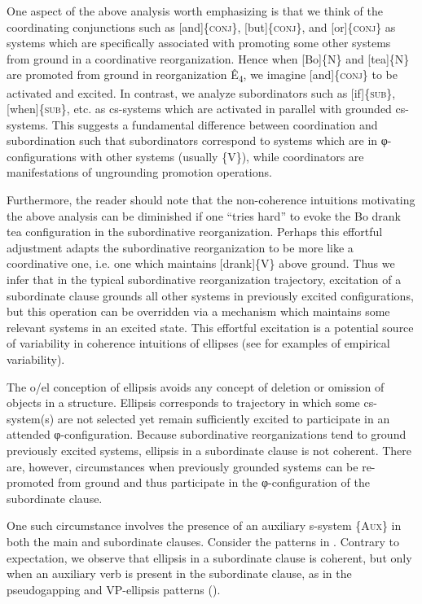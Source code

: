   One aspect of the above analysis worth emphasizing is that we think of the coordinating conjunctions such as [and]\{\textsc{conj}\}, [but]\{\textsc{conj}\}, and [or]\{\textsc{conj}\} as systems which are specifically associated with promoting some other systems from ground in a coordinative reorganization. Hence when [Bo]\{N\} and [tea]\{N\} are promoted from ground in reorganization Ê\textsubscript{4}, we imagine [and]\{\textsc{conj}\} to be activated and excited. In contrast, we analyze subordinators such as [if]\{\textsc{sub}\}, [when]\{\textsc{sub}\}, etc. as cs-systems which are activated in parallel with grounded cs-systems. This suggests a fundamental difference between coordination and subordination such that subordinators correspond to systems which are in φ-configurations with other systems (usually \{V\}), while coordinators are manifestations of ungrounding promotion operations.

  Furthermore, the reader should note that the non-coherence intuitions motivating the above analysis can be diminished if one “tries hard” to evoke the {\textbar}Bo drank tea{\textbar} configuration in the subordinative reorganization. Perhaps this effortful adjustment adapts the subordinative reorganization to be more like a coordinative one, i.e. one which maintains [drank]\{V\} above ground. Thus we infer that in the typical subordinative reorganization trajectory, excitation of a subordinate clause grounds all other systems in previously excited configurations, but this operation can be overridden via a mechanism which maintains some relevant systems in an excited state. This effortful excitation is a potential source of variability in coherence intuitions of ellipses (see \citealt{FrazierClifton2005,Phillips2003,PhillipsParker2014} for examples of empirical variability). 

  The o/el conception of ellipsis avoids any concept of deletion or omission of objects in a structure. Ellipsis corresponds to trajectory in which some cs-system(s) are not selected yet remain sufficiently excited to participate in an attended φ-configuration. Because subordinative reorganizations tend to ground previously excited systems, ellipsis in a subordinate clause is not coherent. There are, however, circumstances when previously grounded systems can be re-promoted from ground and thus participate in the φ-configuration of the subordinate clause. 

  One such circumstance involves the presence of an auxiliary s-system \{A\textsc{ux}\} in both the main and subordinate clauses. Consider the patterns in {}. Contrary to expectation, we observe that ellipsis in a subordinate clause is coherent, but only when an auxiliary verb is present in the subordinate clause, as in the pseudogapping and VP-ellipsis patterns (\citealt{Johnson2001,Johnson2009,Merchant2001}).

